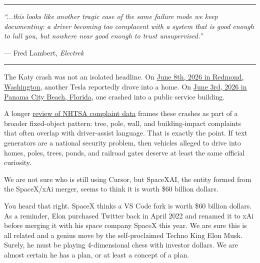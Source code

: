 \documentclass{news}
\begin{document}
\begin{center}
\begin{minipage}{0.92\linewidth}
\small
\hrule
\vspace{1mm}
\textit{``...this looks like another tragic case of the same failure mode we keep documenting: a driver becoming too complacent with a system that is good enough to lull you, but nowhere near good enough to trust unsupervised.''}
\par\vspace{1mm}
\raggedleft --- Fred Lambert, \textit{Electrek}
\vspace{1mm}
\hrule
\end{minipage}
\end{center}

The Katy crash was not an isolated headline. On \href{https://www.king5.com/article/news/local/tesla-crashes-into-redmond-garage-after-reported-autopilot-malfunction/281-686c0c6a-0a5a-41ea-9675-550aeaffdd68}{June 8th, 2026 in Redmond, Washington}, another Tesla reportedly drove into a home. On \href{https://www.king5.com/article/news/local/tesla-crashes-into-redmond-garage-after-reported-autopilot-malfunction/281-686c0c6a-0a5a-41ea-9675-550aeaffdd68}{June 3rd, 2026 in Panama City Beach, Florida}, one crashed into a public service building.

A longer \href{https://alshival.ai/publications/tesla-fsd/}{review of NHTSA complaint data} frames these crashes as part of a broader fixed-object pattern: tree, pole, wall, and building-impact complaints that often overlap with driver-assist language. That is exactly the point. If text generators are a national security problem, then vehicles alleged to drive into homes, poles, trees, ponds, and railroad gates deserve at least the same official curiosity.

We are not sure who is still using Cursor, but SpaceXAI, the entity formed from the SpaceX/xAi merger, seems to think it is worth \$60 billion dollars.

You heard that right. SpaceX thinks a VS Code fork is worth \$60 billion dollars. As a reminder, Elon purchased Twitter back in April 2022 and renamed it to xAi before merging it with his space company SpaceX this year. We are sure this is all related and a genius move by the self-proclaimed Techno King Elon Musk. Surely, he must be playing 4-dimensional chess with investor dollars. We are almost certain he has a plan, or at least a concept of a plan.
\end{document}

